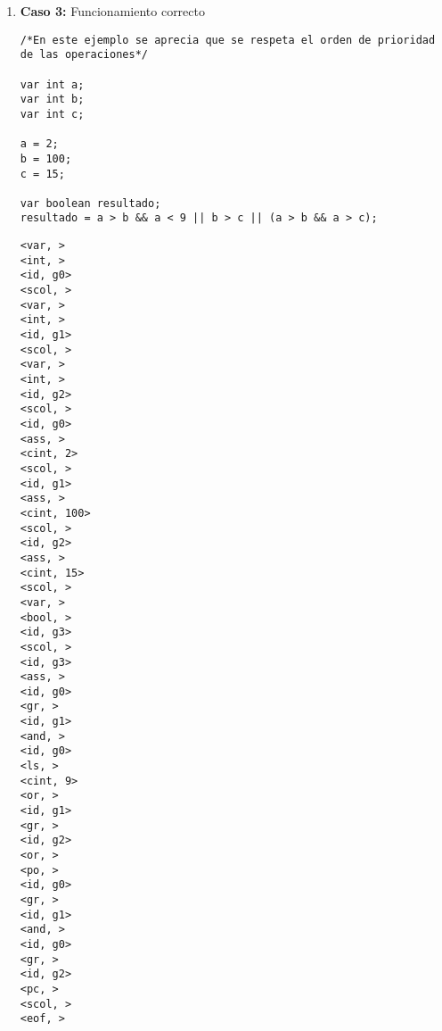 \begin{enumerate}
\begin{tcolorbox}[title={Árbol sintáctico}, colback=white, breakable]
\begin{lstlisting}
                  · EXPAND (41)
                    · lambda
                · EXPOR (38)
                  · lambda
              · NEXTPARAM (33)
                · lambda
            · )
          · ;
      · P (2)
        · STATEMENT (19)
          · ATOMSTATEMENT (21)
            · output
            · EXP1 (36)
              · EXP2 (39)
                · EXP3 (42)
                  · EXP4 (47)
                    · EXPATOM (53)
                      · (
                      · EXP1 (36)
                        · EXP2 (39)
                          · EXP3 (42)
                            · EXP4 (47)
                              · EXPATOM (52)
                                · id
                                · IDVAL (59)
                                  · lambda
                              · ARITH (49)
                                · lambda
                            · COMP (44)
                              · lambda
                          · EXPAND (41)
                            · lambda
                        · EXPOR (38)
                          · lambda
                      · )
                    · ARITH (49)
                      · lambda
                  · COMP (44)
                    · lambda
                · EXPAND (41)
                  · lambda
              · EXPOR (38)
                · lambda
            · ;
        · P (3)
          · eof
        \end{lstlisting}
    \end{tcolorbox}





    \item \textbf{Caso 3:} Funcionamiento correcto
    \begin{tcolorbox}[title={Código fuente}, colback=white]
        \begin{lstlisting}
/*En este ejemplo se aprecia que se respeta el orden de prioridad de las operaciones*/

var int a;
var int b;
var int c;

a = 2;
b = 100;
c = 15;

var boolean resultado;
resultado = a > b && a < 9 || b > c || (a > b && a > c);
        \end{lstlisting}
    \end{tcolorbox}

    \begin{tcolorbox}[title={Volcado del fichero de tokens}, colback=white]
        \begin{lstlisting}
<var, >
<int, >
<id, g0>
<scol, >
<var, >
<int, >
<id, g1>
<scol, >
<var, >
<int, >
<id, g2>
<scol, >
<id, g0>
<ass, >
<cint, 2>
<scol, >
<id, g1>
<ass, >
<cint, 100>
<scol, >
<id, g2>
<ass, >
<cint, 15>
<scol, >
<var, >
<bool, >
<id, g3>
<scol, >
<id, g3>
<ass, >
<id, g0>
<gr, >
<id, g1>
<and, >
<id, g0>
<ls, >
<cint, 9>
<or, >
<id, g1>
<gr, >
<id, g2>
<or, >
<po, >
<id, g0>
<gr, >
<id, g1>
<and, >
<id, g0>
<gr, >
<id, g2>
<pc, >
<scol, >
<eof, >
        \end{lstlisting}
    \end{tcolorbox}


\end{enumerate}
